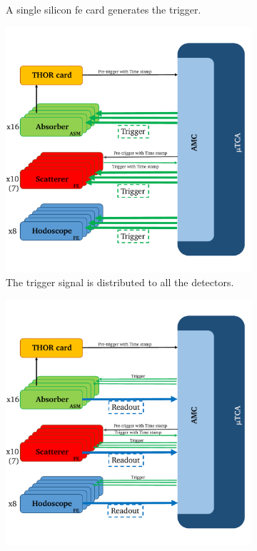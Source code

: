 \begin{figure}
\begin{subfigure}[t]{0.5\textwidth}
\caption[A single silicon \gls{fe} card generates the trigger.]{A single silicon \gls{fe} card generates the trigger.}
\label{chapappA::subfig::triggerLogic_4}
\end{subfigure}%
\newline
\begin{subfigure}[t]{0.5\textwidth}
 \centering
\includegraphics[width=0.9\linewidth]{03_GraphicFiles/appendixA_dataFormat/triggerLogic_5.pdf}
\caption[Trigger signal is distributed to all the detectors.]{The trigger signal is distributed to all the detectors.}\label{chapappA::subfig::triggerLogic_5}
\end{subfigure}%
\begin{subfigure}[t]{0.5\textwidth}
 \centering
\includegraphics[width=0.9\linewidth]{03_GraphicFiles/appendixA_dataFormat/triggerLogic_6.pdf}

\end{subfigure}
\end{figure}
